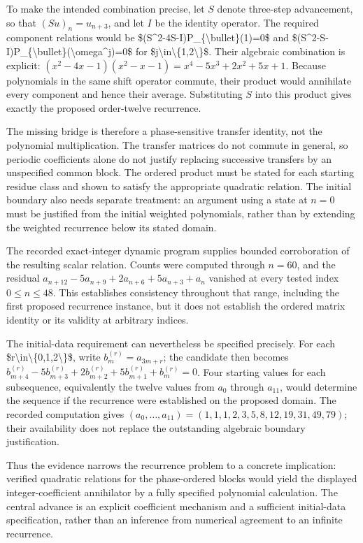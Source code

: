 \documentclass[11pt]{article}
\begin{document}
To make the intended combination precise, let $S$ denote three-step advancement, so that $(Su)_n=u_{n+3}$, and let $I$ be the identity operator. The required component relations would be \$(S\textasciicircum{}2-4S-I)P\_\{\textbackslash{}bullet\}(1)=0\$ and \$(S\textasciicircum{}2-S-I)P\_\{\textbackslash{}bullet\}(\textbackslash{}omega\textasciicircum{}j)=0\$ for \$j\textbackslash{}in\textbackslash{}\{1,2\textbackslash{}\}\$. Their algebraic combination is explicit: $(x^2-4x-1)(x^2-x-1)=x^4-5x^3+2x^2+5x+1$. Because polynomials in the same shift operator commute, their product would annihilate every component and hence their average. Substituting $S$ into this product gives exactly the proposed order-twelve recurrence.

The missing bridge is therefore a phase-sensitive transfer identity, not the polynomial multiplication. The transfer matrices do not commute in general, so periodic coefficients alone do not justify replacing successive transfers by an unspecified common block. The ordered product must be stated for each starting residue class and shown to satisfy the appropriate quadratic relation. The initial boundary also needs separate treatment: an argument using a state at $n=0$ must be justified from the initial weighted polynomials, rather than by extending the weighted recurrence below its stated domain.

The recorded exact-integer dynamic program supplies bounded corroboration of the resulting scalar relation. Counts were computed through $n=60$, and the residual $a_{n+12}-5a_{n+9}+2a_{n+6}+5a_{n+3}+a_n$ vanished at every tested index $0\leq n\leq48$. This establishes consistency throughout that range, including the first proposed recurrence instance, but it does not establish the ordered matrix identity or its validity at arbitrary indices.

The initial-data requirement can nevertheless be specified precisely. For each \$r\textbackslash{}in\textbackslash{}\{0,1,2\textbackslash{}\}\$, write $b_m^{(r)}=a_{3m+r}$; the candidate then becomes $b_{m+4}^{(r)}-5b_{m+3}^{(r)}+2b_{m+2}^{(r)}+5b_{m+1}^{(r)}+b_m^{(r)}=0$. Four starting values for each subsequence, equivalently the twelve values from $a_0$ through $a_{11}$, would determine the sequence if the recurrence were established on the proposed domain. The recorded computation gives $(a_0,\ldots,a_{11})=(1,1,1,2,3,5,8,12,19,31,49,79)$; their availability does not replace the outstanding algebraic boundary justification.

Thus the evidence narrows the recurrence problem to a concrete implication: verified quadratic relations for the phase-ordered blocks would yield the displayed integer-coefficient annihilator by a fully specified polynomial calculation. The central advance is an explicit coefficient mechanism and a sufficient initial-data specification, rather than an inference from numerical agreement to an infinite recurrence.
\end{document}
